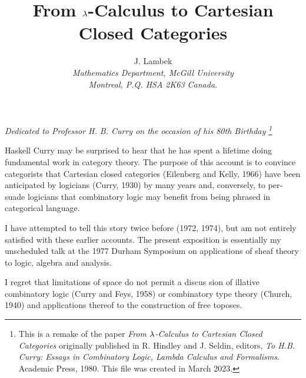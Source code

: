 \makeatletter
\DeclareRobustCommand{\eqx}{\mathrel{\mathpalette\eq@{x}}}
\newcommand{\eq@}[2]{%
  \vtop{\offinterlineskip
    \ialign{\hfil##\hfil\cr
      $\m@th#1=$\cr %
      \noalign{\sbox\z@{$\m@th#1\mkern0mu$}\kern-\wd\z@}
      $\m@th\alexey@demote{#1}#2$\cr
    }%
  }%
}
\newcommand{\alexey@demote}[1]{%
  \ifx#1\displaystyle\scriptstyle\else
  \ifx#1\textstyle\scriptstyle\else
  \scriptscriptstyle\fi\fi
}

\newcommand*\dotop{\mathpalette\bigcdot@{.6}}
\newcommand*\bigcdot@[2]{\mathbin{\vcenter{\hbox{\scalebox{#2}{$\m@th#1\bullet$}}}}}
\makeatother

\title{\large From $\lambda$-Calculus to Cartesian Closed Categories}
\author{\normalsize J. Lambek \\
{\small\it Mathematics Department, McGill University} \\
{\small\it Montreal, P.Q. HSA 2K63 Canada.}}

\maketitle
{\centerline
{\small\it Dedicated to Professor H. B. Curry on the occasion of his 80th Birthday
%
\footnote{ This is a remake of the paper {\it From $\lambda$-Calculus to Cartesian Closed
Categories} originally published in R. Hindley and J. Seldin, editors, {\it To H.B. Curry:
Essays in Combinatory Logic, Lambda Calculus and Formalisms}. Academic Press, 1980. This
file was created in March 2023.}}} \bigskip\bigskip

\noindent
Haskell Curry may be surprised to hear that he has spent a lifetime doing fundamental work
in category theory. The purpose of this account is to convince categorists that Cartesian
closed categories (Eilenberg and Kelly, 1966) have been anticipated by logicians (Curry,
1930) by many years and, conversely, to per­ suade logicians that combinatory logic may
benefit from being phrased in categorical language.

I have attempted to tell this story twice before (1972, 1974), but am not entirely
satisfied with these earlier accounts. The present exposition is essentially my
unscheduled talk at the 1977 Durham Symposium on applications of sheaf theory to logic,
algebra and analysis.

I regret that limitations of space do not permit a discus­ sion of illative combinatory
logic (Curry and Feys, 1958) or combinatory type theory (Church, 1940) and applications
thereof to the construction of free toposes.

